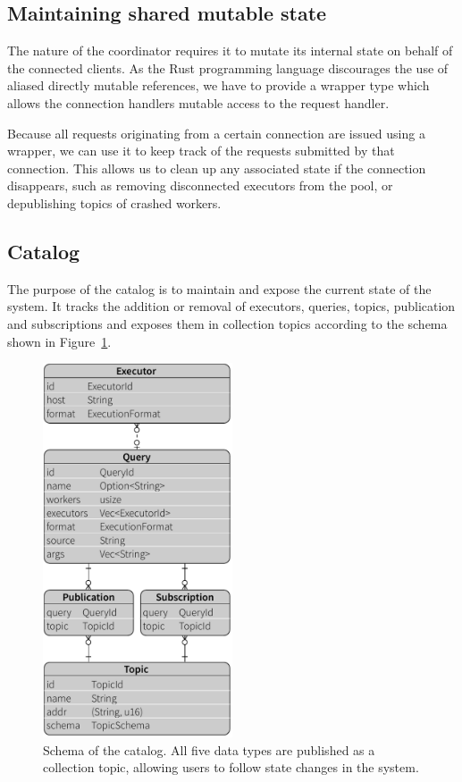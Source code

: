 \subsection{Maintaining shared mutable state}

The nature of the coordinator requires it to mutate its internal state on
behalf of the connected clients. As the Rust programming language discourages
the use of aliased directly mutable references, we have to provide a wrapper
type which allows the connection handlers mutable access to the request handler.

Because all requests originating from a certain connection are issued using a
wrapper, we can use it to keep track of the requests submitted by that connection.
This allows us to clean up any associated state if the connection disappears,
such as removing disconnected executors from the pool, or depublishing 
topics of crashed workers.

\subsection{Catalog}

The purpose of the catalog is to maintain and expose the current state of the
system. It tracks the addition or removal of executors, queries, topics,
publication and subscriptions and exposes them in collection topics according
to the schema shown in Figure~\ref{fig:model}.

\begin{figure}[htb]
  \centering
    \includegraphics[width=0.5\textwidth]{figures/model}
  \caption[Schema of the catalog.]{Schema of the catalog. All five data types
  are published as a collection topic, allowing users to follow state changes
  in the system.}
  \label{fig:model}
\end{figure}

